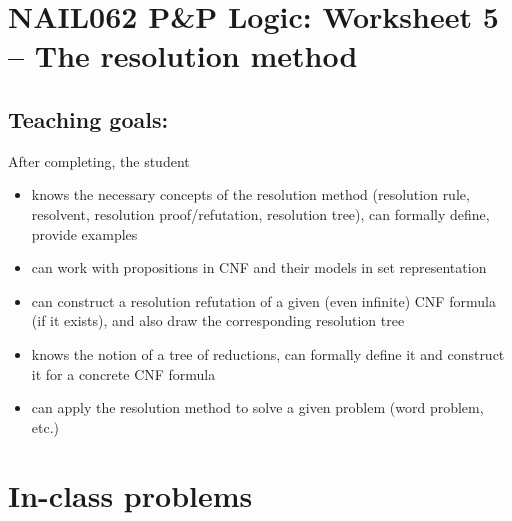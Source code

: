 \section*{NAIL062 P\&P Logic: Worksheet 5 -- The resolution method}


\subsection*{Teaching goals:} After completing, the student

    \begin{itemize}\setlength{\itemsep}{0pt}
        \item knows the necessary concepts of the resolution method (resolution rule, resolvent, resolution proof/refutation, resolution tree), can formally define, provide examples
        \item can work with propositions in CNF and their models in set representation
        \item can construct a resolution refutation of a given (even infinite) CNF formula (if it exists), and also draw the corresponding resolution tree
        \item knows the notion of a tree of reductions, can formally define it and construct it for a concrete CNF formula
        \item can apply the resolution method to solve a given problem (word problem, etc.)
    \end{itemize}
    

\section*{In-class problems}



